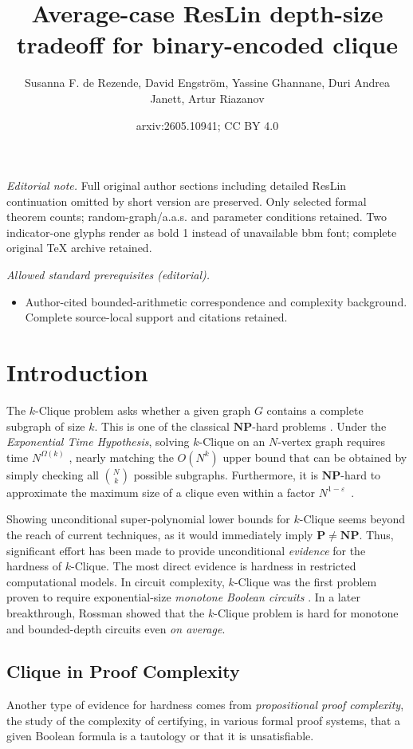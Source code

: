 \documentclass[10pt,a4paper]{article}
\title{Average-case ResLin depth-size tradeoff for binary-encoded clique}
\author{Susanna F. de Rezende, David Engström, Yassine Ghannane, Duri Andrea Janett, Artur Riazanov}
\date{arxiv:2605.10941; CC BY 4.0}
\theoremstyle{definition}
\theoremstyle{remark}
\theoremstyle{example}
\theoremstyle{plain}
\newcommand{\NP}{\mathbf{NP}}
\newcommand{\graphSize}{N}
\newcommand{\kClique}{$k$-\textsf{Clique}\xspace}
\begin{document}
\maketitle
\noindent\textit{Editorial note.} Full original author sections including detailed ResLin continuation omitted by short version are preserved. Only selected formal theorem counts; random-graph/a.a.s. and parameter conditions retained. Two indicator-one glyphs render as bold 1 instead of unavailable bbm font; complete original TeX archive retained.\par\medskip
\noindent\textit{Allowed standard prerequisites (editorial).}\begin{itemize}
\item Author-cited bounded-arithmetic correspondence and complexity background. Complete source-local support and citations retained.
\end{itemize}\medskip
\section{Introduction}
\label{sec:introduction}

The \kClique problem asks whether a given graph $G$ contains 
a complete subgraph of size $k$.
This is one of the classical $\NP$-hard problems \cite{Karp1972}.
Under the \emph{Exponential Time Hypothesis},
solving \kClique on an $\graphSize$-vertex graph requires time $\graphSize^{\Omega(k)}$ \cite{CHKX04approx}, nearly matching the $O(\graphSize^k)$ upper bound that can be obtained by simply checking all $\binom{\graphSize}{k}$ possible subgraphs.
Furthermore, it is $\NP$-hard to approximate the maximum size of a clique even within a factor $\graphSize^{1-\varepsilon}$~\cite{haastad1999clique, Zuckerman07}.

Showing unconditional super-polynomial lower bounds for \kClique seems beyond the reach of current techniques, as it would immediately imply $\mathbf{P} \neq \NP$. Thus, significant effort has been made to provide unconditional \emph{evidence} for the hardness of \kClique. The most direct evidence is hardness in restricted computational models. 
In circuit complexity, 
\kClique was the first 
problem proven to require exponential-size \emph{monotone Boolean circuits} \cite{Razborov1985}. 
In a later breakthrough, Rossman \cite{Rossman08ConstantDepth, Rossman14Monotone} showed 
that the \kClique problem is hard for monotone and bounded-depth circuits even \emph{on average}. 
\subsection{Clique in Proof Complexity}
Another type of evidence for hardness comes from \emph{propositional proof complexity},
the study of 
the complexity of certifying, in various formal proof systems, that a given Boolean formula is a tautology or that it is unsatisfiable.
\end{document}
